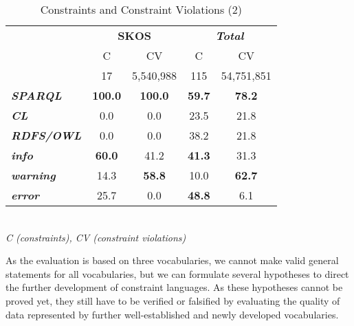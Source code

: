\documentclass[conference]{IEEEtran}
\newcommand{\tb}[1]{\todo[size=\small, color=green!40]{\textbf{Thomas:} #1}}
\begin{document}
\begin{table}[H]
		\scriptsize
    \begin{center}
		\caption{Constraints and Constraint Violations (2)}
		\label{tab:evaluation-constraint-violations-2}
    \begin{tabular}{@{}lcccc@{}}
		\hline
    \multirow{2}{*}{} &
      \multicolumn{2}{c}{\textbf{SKOS}} &
      \multicolumn{2}{c}{\textbf{\emph{Total}}} \\
    \textbf{} & C & CV & C & CV \\
    \hline
		 & 17 & 5,540,988 & 115 & 54,751,851 \\
		\hline
		\textbf{\emph{SPARQL}} & \textbf{100.0} & \textbf{100.0} & \textbf{59.7} & \textbf{78.2} \\
		\textbf{\emph{CL}} & 0.0 & 0.0 & 23.5 & 21.8 \\
		\textbf{\emph{RDFS/OWL}} & 0.0 & 0.0 & 38.2 & 21.8 \\
		\hline
		\textbf{\emph{info}} & \textbf{60.0} & 41.2 & \textbf{41.3} & 31.3 \\
		\textbf{\emph{warning}} & 14.3 & \textbf{58.8} & 10.0 & \textbf{62.7} \\
		\textbf{\emph{error}} & 25.7 & 0.0 & \textbf{48.8} & 6.1\\
    \bottomrule
    \end{tabular}
    \\ \emph{C (constraints), CV (constraint violations)}
    \end{center}
\end{table}

As the evaluation is based on three vocabularies, 
we cannot make valid general statements for all vocabularies,
but we can formulate several hypotheses to direct the further development of constraint languages.
As these hypotheses cannot be proved yet, 
they still have to be verified or falsified
by evaluating the quality of data represented by further well-established and newly developed vocabularies.
\end{document}
